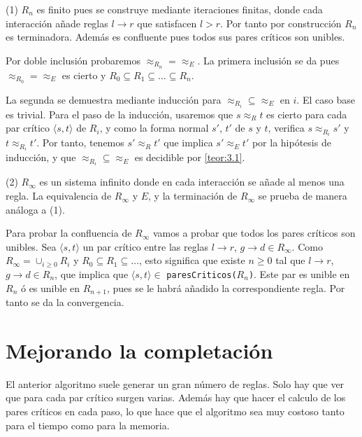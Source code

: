 \begin{demo}
  (1) $R_n$ es finito pues se construye mediante iteraciones finitas,
  donde cada interacción añade reglas $l \rightarrow r$ que satisfacen
  $l > r$. Por tanto por construcción $R_n$ es terminadora. Además es
  confluente pues todos sus pares críticos son unibles.

  Por doble inclusión probaremos $\approx_{R_n} = \approx_E$.  La
  primera inclusión se da pues $\approx_{R_0} = \approx_E$ es cierto y
  $R_0 \subseteq R_1 \subseteq \dots \subseteq R_n$.

  La segunda se demuestra mediante inducción para
  $\approx_{R_i} \subseteq \approx_E$ en $i$.  El caso base es
  trivial. Para el paso de la inducción, usaremos que $s \approx_R t$
  es cierto para cada par crítico $\langle s, t \rangle$ de $R_i$, y
  como la forma normal $s'$, $t'$ de $s$ y $t$, verifica
  $s \approx_{R_i} s'$ y $t \approx_{R_i} t'$. Por tanto, tenemos
  $s' \approx_R t'$ que implica $s' \approx_E t'$ por la hipótesis de
  inducción, y que $ \approx_{R_i} \subseteq \approx_E$ es decidible
  por \ref{teor:3.1}.

  (2) $R_{\infty }$ es un sistema infinito donde en cada interacción
  se añade al menos una regla. La equivalencia de $R_{\infty }$ y $E$,
  y la terminación de $R_{\infty }$ se prueba de manera análoga a (1).

  Para probar la confluencia de $R_{\infty }$ vamos a probar que todos
  los pares críticos son unibles. Sea $\langle s,t \rangle$ un par
  crítico entre las reglas $l \rightarrow r$,
  $g \rightarrow d \in R_{\infty }$. Como
  $R_{\infty } = \cup_{i \geq 0} R_i$ y
  $R_0 \subseteq R_1 \subseteq \dots$, esto significa que existe
  $n \geq 0$ tal que $l \rightarrow r$, $g \rightarrow d \in R_n$, que
  implica que $\langle s,t \rangle \in$
  \texttt{paresCriticos($R_n$)}. Este par es unible en $R_n$ ó es
  unible en $R_{n+1}$, pues se le habrá añadido la correspondiente
  regla. Por tanto se da la convergencia.
\end{demo}

\section{Mejorando la completación}

El anterior algoritmo suele generar un gran número de reglas. Solo hay
que ver que para cada par crítico surgen varias. Además hay que hacer
el calculo de los pares críticos en cada paso, lo que hace que el algoritmo sea muy costoso tanto para el tiempo como para la memoria.

